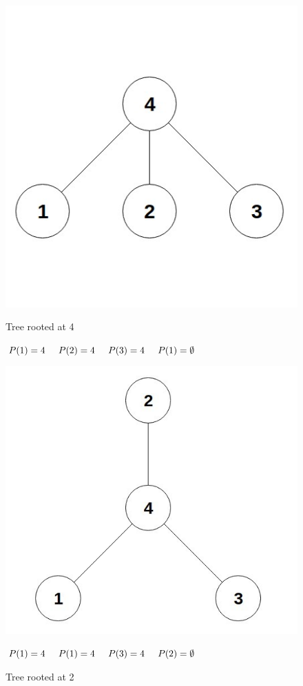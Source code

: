 \documentclass[twoside]{article}
\begin{document}
\begin{figure}[!h]
\centering
\begin{minipage}{.5\textwidth}
  \centering
  \includegraphics[scale=.25]{g1}
  \caption{Tree rooted at 4} $P(1) = 4\hspace{0.5cm}P(2) = 4\hspace{0.5cm}P(3) = 4\hspace{0.5cm}P(1) = \emptyset$
  \label{fig:test1}
\end{minipage}%
\begin{minipage}{.5\textwidth}
  \centering
  \includegraphics[scale=.25]{g2}
  \caption{Tree rooted at 2} $P(1) = 4\hspace{0.5cm}P(1) = 4\hspace{0.5cm}P(3) = 4\hspace{0.5cm}P(2) = \emptyset$
  \label{fig:test2}
\end{minipage}
\end{figure}
\end{document}
